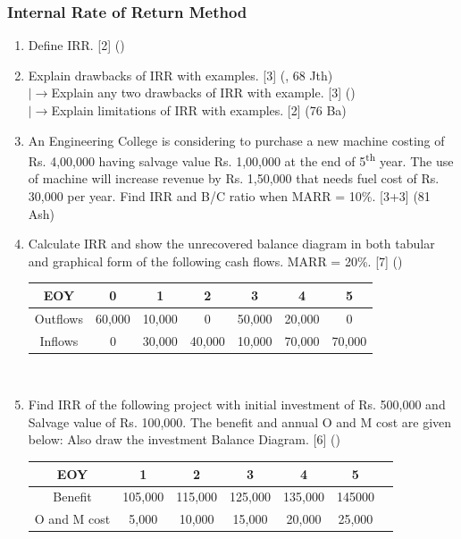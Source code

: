 \documentclass[12pt]{article}
\newcommand{\lb}{\\ $\left|\rightarrow\right.$}
\newcommand{\super}[1]{\textsuperscript{#1}}
\begin{document}
	\subsubsection{Internal Rate of Return Method}
	\begin{enumerate}[noitemsep, topsep = 0pt]
		\item Define IRR. \hfill [2] ()
		
		\item Explain drawbacks of IRR with examples. \hfill [3] (, 68 Jth)
		\lb  Explain any two drawbacks of IRR with example. \hfill [3] ()
		\lb  Explain limitations of IRR with examples. \hfill [2] (76 Ba)	
		
		\item An Engineering College is considering to purchase a new machine costing of Rs. 4,00,000 having salvage value Rs. 1,00,000 at the end of 5\super{th} year. The use of machine will increase revenue by Rs. 1,50,000 that needs fuel cost of Rs. 30,000 per year. Find IRR and B/C ratio when MARR = 10\%. \hfill [3+3] (81 Ash)
		
		\item Calculate IRR and show the unrecovered balance diagram in both tabular and graphical form of the following cash flows. MARR = 20\%. \hfill [7] ()
		\begin{tabular}{|c|c|c|c|c|c|c|}
			\hline
			EOY & 0 & 1 & 2 & 3 & 4 & 5\\ \hline
			Outflows & 60,000 & 10,000 & 0 & 50,000 & 20,000 & 0\\ \hline
			Inflows & 0 & 30,000 & 40,000 & 10,000 & 70,000 & 70,000\\ \hline
		\end{tabular}\\[1pt]
		
		\item Find IRR of the following project with initial investment of Rs. 500,000 and Salvage value of Rs. 100,000. The benefit and annual O and M cost are given below: Also draw the investment Balance Diagram. \hfill [6] ()\\
		\begin{tabular}{|c|c|c|c|c|c|c|}
			\hline
			EOY & 1 & 2 & 3 & 4 & 5\\ \hline
			Benefit & 105,000 & 115,000 & 125,000 & 135,000 & 145000 \\ \hline
			O and M cost & 5,000 & 10,000 & 15,000 & 20,000 & 25,000 \\ \hline
		\end{tabular}\\[1pt]
		

\end{enumerate}
\end{document}
